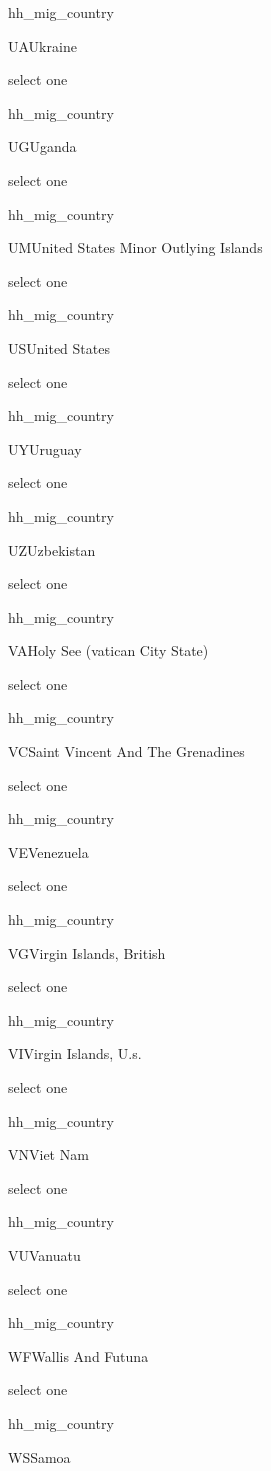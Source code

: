 \documentclass[]{article}
\begin{document}
hh\_mig\_country

UA\textbar{}Ukraine

select one

hh\_mig\_country

UG\textbar{}Uganda

select one

hh\_mig\_country

UM\textbar{}United States Minor Outlying Islands

select one

hh\_mig\_country

US\textbar{}United States

select one

hh\_mig\_country

UY\textbar{}Uruguay

select one

hh\_mig\_country

UZ\textbar{}Uzbekistan

select one

hh\_mig\_country

VA\textbar{}Holy See (vatican City State)

select one

hh\_mig\_country

VC\textbar{}Saint Vincent And The Grenadines

select one

hh\_mig\_country

VE\textbar{}Venezuela

select one

hh\_mig\_country

VG\textbar{}Virgin Islands, British

select one

hh\_mig\_country

VI\textbar{}Virgin Islands, U.s.

select one

hh\_mig\_country

VN\textbar{}Viet Nam

select one

hh\_mig\_country

VU\textbar{}Vanuatu

select one

hh\_mig\_country

WF\textbar{}Wallis And Futuna

select one

hh\_mig\_country

WS\textbar{}Samoa
\end{document}
